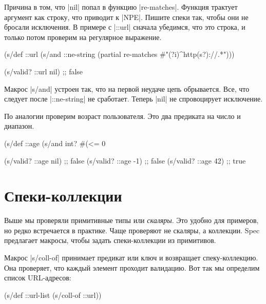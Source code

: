 Причина в том, что \spverb|nil| попал в функцию \spverb|re-matches|. Функция
трактует аргумент как строку, что приводит к \spverb|NPE|. Пишите спеки так,
чтобы они не бросали исключения. В примере с \spverb|::url| сначала убедимся,
что это строка, и только потом проверим на регулярное выражение.

\begin{english}
  \begin{clojure}
(s/def ::url
  (s/and ::ne-string
         (partial re-matches #"(?i)^http(s?)://.*")))

(s/valid? ::url nil) ;; false
  \end{clojure}
\end{english}

Макрос \spverb|s/and| устроен так, что на первой неудаче цепь обрывается. Все,
что следует после \spverb|::ne-string| не сработает. Теперь \spverb|nil| не
спровоцирует исключение.

По аналогии проверим возраст пользователя. Это два предиката на число и
диапазон.

\begin{english}
  \begin{clojure}
(s/def ::age
  (s/and int? #(<= 0 %

(s/valid? ::age nil) ;; false
(s/valid? ::age -1)  ;; false
(s/valid? ::age 42)  ;; true
  \end{clojure}
\end{english}


\section{Спеки-коллекции}

Выше мы проверяли примитивные типы или \emph{скаляры}. Это удобно для примеров,
но редко встречается в практике. Чаще проверяют не скаляры, а коллекции. Spec
предлагает макросы, чтобы задать спеки-коллекции из примитивов.

Макрос \spverb|s/coll-of| принимает предикат или ключ и возвращает
спеку-коллекцию. Она проверяет, что каждый элемент проходит валидацию. Вот так
мы определим список URL-адресов:

\begin{english}
  \begin{clojure}
(s/def ::url-list (s/coll-of ::url))
  \end{clojure}
\end{english}

